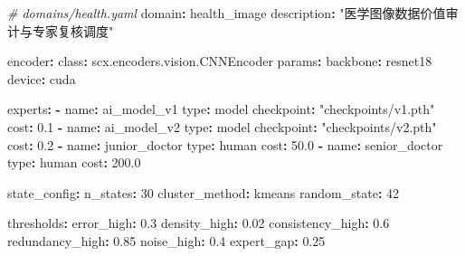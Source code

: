 \documentclass[
  12pt,
]{ctexart}
\newenvironment{Shaded}{}{}
\newcommand{\AttributeTok}[1]{\textcolor[rgb]{0.49,0.56,0.16}{#1}}
\newcommand{\CommentTok}[1]{\textcolor[rgb]{0.38,0.63,0.69}{\textit{#1}}}
\newcommand{\DecValTok}[1]{\textcolor[rgb]{0.25,0.63,0.44}{#1}}
\newcommand{\FloatTok}[1]{\textcolor[rgb]{0.25,0.63,0.44}{#1}}
\newcommand{\FunctionTok}[1]{\textcolor[rgb]{0.02,0.16,0.49}{#1}}
\newcommand{\KeywordTok}[1]{\textcolor[rgb]{0.00,0.44,0.13}{\textbf{#1}}}
\newcommand{\StringTok}[1]{\textcolor[rgb]{0.25,0.44,0.63}{#1}}
\begin{document}
\begin{Shaded}
\begin{Highlighting}[]
\CommentTok{\# domains/health.yaml}
\FunctionTok{domain}\KeywordTok{:}\AttributeTok{ health\_image}
\FunctionTok{description}\KeywordTok{:}\AttributeTok{ }\StringTok{"医学图像数据价值审计与专家复核调度"}

\FunctionTok{encoder}\KeywordTok{:}
\AttributeTok{  }\FunctionTok{class}\KeywordTok{:}\AttributeTok{ scx.encoders.vision.CNNEncoder}
\AttributeTok{  }\FunctionTok{params}\KeywordTok{:}
\AttributeTok{    }\FunctionTok{backbone}\KeywordTok{:}\AttributeTok{ resnet18}
\AttributeTok{    }\FunctionTok{device}\KeywordTok{:}\AttributeTok{ cuda}

\FunctionTok{experts}\KeywordTok{:}
\AttributeTok{  }\KeywordTok{{-}}\AttributeTok{ }\FunctionTok{name}\KeywordTok{:}\AttributeTok{ ai\_model\_v1}
\AttributeTok{    }\FunctionTok{type}\KeywordTok{:}\AttributeTok{ model}
\AttributeTok{    }\FunctionTok{checkpoint}\KeywordTok{:}\AttributeTok{ }\StringTok{"checkpoints/v1.pth"}
\AttributeTok{    }\FunctionTok{cost}\KeywordTok{:}\AttributeTok{ }\FloatTok{0.1}
\AttributeTok{  }\KeywordTok{{-}}\AttributeTok{ }\FunctionTok{name}\KeywordTok{:}\AttributeTok{ ai\_model\_v2}
\AttributeTok{    }\FunctionTok{type}\KeywordTok{:}\AttributeTok{ model}
\AttributeTok{    }\FunctionTok{checkpoint}\KeywordTok{:}\AttributeTok{ }\StringTok{"checkpoints/v2.pth"}
\AttributeTok{    }\FunctionTok{cost}\KeywordTok{:}\AttributeTok{ }\FloatTok{0.2}
\AttributeTok{  }\KeywordTok{{-}}\AttributeTok{ }\FunctionTok{name}\KeywordTok{:}\AttributeTok{ junior\_doctor}
\AttributeTok{    }\FunctionTok{type}\KeywordTok{:}\AttributeTok{ human}
\AttributeTok{    }\FunctionTok{cost}\KeywordTok{:}\AttributeTok{ }\FloatTok{50.0}
\AttributeTok{  }\KeywordTok{{-}}\AttributeTok{ }\FunctionTok{name}\KeywordTok{:}\AttributeTok{ senior\_doctor}
\AttributeTok{    }\FunctionTok{type}\KeywordTok{:}\AttributeTok{ human}
\AttributeTok{    }\FunctionTok{cost}\KeywordTok{:}\AttributeTok{ }\FloatTok{200.0}

\FunctionTok{state\_config}\KeywordTok{:}
\AttributeTok{  }\FunctionTok{n\_states}\KeywordTok{:}\AttributeTok{ }\DecValTok{30}
\AttributeTok{  }\FunctionTok{cluster\_method}\KeywordTok{:}\AttributeTok{ kmeans}
\AttributeTok{  }\FunctionTok{random\_state}\KeywordTok{:}\AttributeTok{ }\DecValTok{42}

\FunctionTok{thresholds}\KeywordTok{:}
\AttributeTok{  }\FunctionTok{error\_high}\KeywordTok{:}\AttributeTok{ }\FloatTok{0.3}
\AttributeTok{  }\FunctionTok{density\_high}\KeywordTok{:}\AttributeTok{ }\FloatTok{0.02}
\AttributeTok{  }\FunctionTok{consistency\_high}\KeywordTok{:}\AttributeTok{ }\FloatTok{0.6}
\AttributeTok{  }\FunctionTok{redundancy\_high}\KeywordTok{:}\AttributeTok{ }\FloatTok{0.85}
\AttributeTok{  }\FunctionTok{noise\_high}\KeywordTok{:}\AttributeTok{ }\FloatTok{0.4}
\AttributeTok{  }\FunctionTok{expert\_gap}\KeywordTok{:}\AttributeTok{ }\FloatTok{0.25}


\end{Highlighting}
\end{Shaded}
\end{document}
